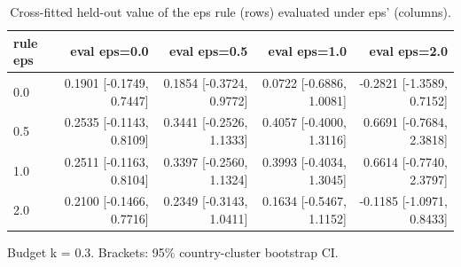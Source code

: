 \begin{table}[htbp]
\centering
\caption{Cross-fitted held-out value of the eps rule (rows) evaluated under eps' (columns).}
\label{tab:agri_policy_matrix}
\begin{tabular}{lrrrr}
\toprule
rule eps & eval eps=0.0 & eval eps=0.5 & eval eps=1.0 & eval eps=2.0 \\
\midrule
0.0 & 0.1901 [-0.1749, 0.7447] & 0.1854 [-0.3724, 0.9772] & 0.0722 [-0.6886, 1.0081] & -0.2821 [-1.3589, 0.7152] \\
0.5 & 0.2535 [-0.1143, 0.8109] & 0.3441 [-0.2526, 1.1333] & 0.4057 [-0.4000, 1.3116] & 0.6691 [-0.7684, 2.3818] \\
1.0 & 0.2511 [-0.1163, 0.8104] & 0.3397 [-0.2560, 1.1324] & 0.3993 [-0.4034, 1.3045] & 0.6614 [-0.7740, 2.3797] \\
2.0 & 0.2100 [-0.1466, 0.7716] & 0.2349 [-0.3143, 1.0411] & 0.1634 [-0.5467, 1.1152] & -0.1185 [-1.0971, 0.8433] \\
\bottomrule
\end{tabular}
\par\smallskip\footnotesize Budget k = 0.3. Brackets: 95\% country-cluster bootstrap CI.
\end{table}
